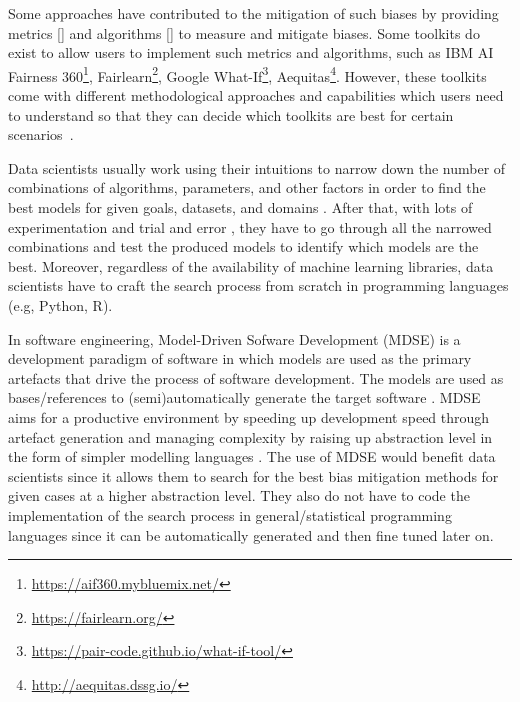 \documentclass[final,5p,times,twocolumn]{elsarticle}
\begin{document}
Some approaches have contributed to the mitigation of such biases by providing metrics []  and algorithms [] to measure and mitigate biases. Some toolkits do exist to allow users to implement such metrics and algorithms, such as IBM AI Fairness 
360\footnote{\url{https://aif360.mybluemix.net/}}, Fairlearn\footnote{\url{https://fairlearn.org/}}, Google What-If\footnote{\url{https://pair-code.github.io/what-if-tool/}}, Aequitas\footnote{\url{http://aequitas.dssg.io/}}.
However, these toolkits come with different methodological approaches and capabilities which users need to understand so that they can decide which toolkits are best for certain scenarios~\cite{lee2021landscape}.  

Data scientists usually work using their intuitions to narrow down the number of combinations of algorithms, parameters, and other factors in order to find the best models for given goals, datasets, and domains \cite{muller2016introduction}. After that, with lots of experimentation and trial and error \cite{byrne2017development}, they have to go through all the narrowed combinations and test the produced models to identify which models are the best. Moreover, regardless of the availability of machine learning libraries, data scientists have to craft the search process from scratch in programming languages (e.g, Python, R).

In software engineering, Model-Driven Sofware Development (MDSE) is a development paradigm of software in which models are used as the primary artefacts that drive the process of software development. The models are used as bases/references to (semi)automatically generate the target software \cite{brambilla2017model}. MDSE aims for a productive environment by speeding up development speed through artefact generation and managing complexity by raising up abstraction level in the form of simpler modelling languages \cite{volter2013model}. The use of MDSE would benefit data scientists since it allows them to search for the best bias mitigation methods for given cases at a higher abstraction level. They also do not have to code the implementation of the search process in general/statistical programming languages since it can be automatically generated and then fine tuned later on. 
\end{document}
